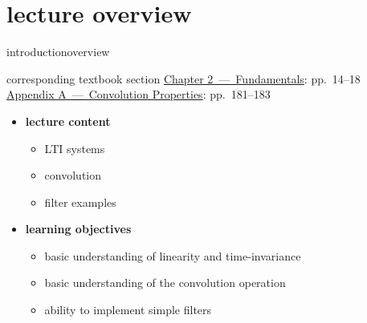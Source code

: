 




\subtitle{Module 2.3: Fundamentals~---~Convolution}


	

    \section[overview]{lecture overview}
        \begin{frame}{introduction}{overview}
            \begin{block}{corresponding textbook section}
                    \href{http://ieeexplore.ieee.org/xpl/articleDetails.jsp?tp=&arnumber=6331119&}{Chapter 2~---~Fundamentals}: pp.~14--18\\
                    \href{http://ieeexplore.ieee.org/xpl/articleDetails.jsp?tp=&arnumber=6331119&}{Appendix A~---~Convolution Properties}: pp.~181--183
            \end{block}

            \begin{itemize}
                \item   \textbf{lecture content}
                    \begin{itemize}
                        \item   LTI systems
                        \item   convolution
                        \item   filter examples
                    \end{itemize}
                \bigskip
                \item<2->   \textbf{learning objectives}
                    \begin{itemize}
                        \item   basic understanding of linearity and time-invariance
                        \item   basic understanding of the convolution operation
                        \item   ability to implement simple filters
                    \end{itemize}
            \end{itemize}
        \end{frame}
        
